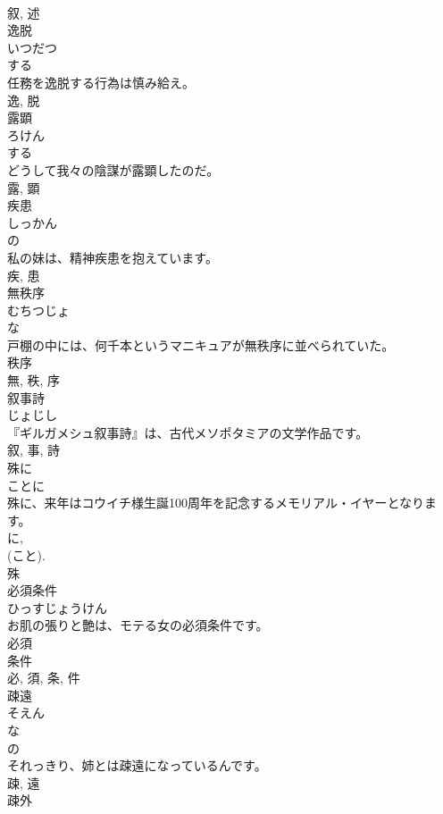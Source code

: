 \documentclass[8pt]{extreport}
\begin{document}
\begin{CJK}{UTF8}{min}
\\	叙, 述	
\\	逸脱	
\\	いつだつ	
\\	する 
\\	任務を逸脱する行為は慎み給え。	
\\	逸, 脱	
\\	露顕	
\\	ろけん	
\\	する 
\\	どうして我々の陰謀が露顕したのだ。	
\\	露, 顕	
\\	疾患	
\\	しっかん	
\\	の 
\\	私の妹は、精神疾患を抱えています。	
\\	疾, 患	
\\	無秩序	
\\	むちつじょ	
\\	な 
\\	戸棚の中には、何千本というマニキュアが無秩序に並べられていた。	
\\	秩序 
\\	無, 秩, 序	
\\	叙事詩	
\\	じょじし	
\\	『ギルガメシュ叙事詩』は、古代メソポタミアの文学作品です。	
\\	叙, 事, 詩	
\\	殊に	
\\	ことに	
\\	殊に、来年はコウイチ様生誕100周年を記念するメモリアル・イヤーとなります。	
\\	に, 
\\	(こと). 
\\	殊	
\\	必須条件	
\\	ひっすじょうけん	
\\	お肌の張りと艶は、モテる女の必須条件です。	
\\	必須 
\\	条件 
\\	必, 須, 条, 件	
\\	疎遠	
\\	そえん	
\\	な 
\\	の 
\\	それっきり、姉とは疎遠になっているんです。	
\\	疎, 遠	
\\	疎外	

\end{CJK}
\end{document}
